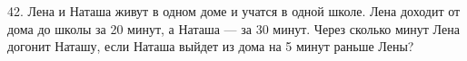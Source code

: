 42. Лена и Наташа живут в одном доме и учатся в одной школе. Лена доходит от дома до школы за 20 минут, а Наташа --- за 30 минут. Через сколько минут Лена догонит Наташу, если Наташа выйдет из дома на 5 минут раньше Лены?\\

